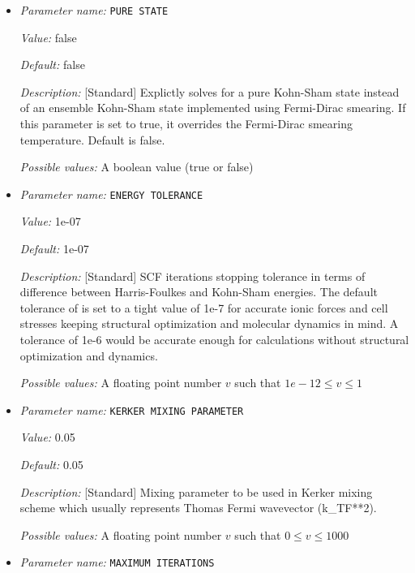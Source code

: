 \begin{itemize}
{\it Possible values:} A boolean value (true or false)
\item {\it Parameter name:} {\tt PURE STATE}
\label{parameters:SCF parameters/PURE STATE}
\label{parameters:SCF_20parameters/PURE_20STATE}


{\it Value:} false


{\it Default:} false


{\it Description:} [Standard] Explictly solves for a pure Kohn-Sham state instead of an ensemble Kohn-Sham state implemented using Fermi-Dirac smearing. If this parameter is set to true, it overrides the Fermi-Dirac smearing temperature. Default is false.


{\it Possible values:} A boolean value (true or false)
\item {\it Parameter name:} {\tt ENERGY TOLERANCE}
\label{parameters:SCF parameters/ENERGY TOLERANCE}
\label{parameters:SCF_20parameters/ENERGY_20TOLERANCE}


{\it Value:} 1e-07


{\it Default:} 1e-07


{\it Description:} [Standard] SCF iterations stopping tolerance in terms of difference between Harris-Foulkes and Kohn-Sham energies. The default tolerance of is set to a tight value of 1e-7 for accurate ionic forces and cell stresses keeping structural optimization and molecular dynamics in mind. A tolerance of 1e-6 would be accurate enough for calculations without structural optimization and dynamics.


{\it Possible values:} A floating point number $v$ such that $1e-12 \leq v \leq 1$
\item {\it Parameter name:} {\tt KERKER MIXING PARAMETER}
\label{parameters:SCF parameters/KERKER MIXING PARAMETER}
\label{parameters:SCF_20parameters/KERKER_20MIXING_20PARAMETER}


{\it Value:} 0.05


{\it Default:} 0.05


{\it Description:} [Standard] Mixing parameter to be used in Kerker mixing scheme which usually represents Thomas Fermi wavevector (k\_{TF}**2).


{\it Possible values:} A floating point number $v$ such that $0 \leq v \leq 1000$
\item {\it Parameter name:} {\tt MAXIMUM ITERATIONS}
\label{parameters:SCF parameters/MAXIMUM ITERATIONS}
\label{parameters:SCF_20parameters/MAXIMUM_20ITERATIONS}



\end{itemize}

